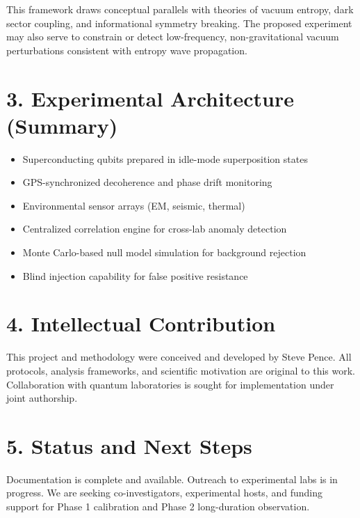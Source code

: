 \documentclass[12pt]{article}
\begin{document}
This framework draws conceptual parallels with theories of vacuum entropy, dark sector coupling, and informational symmetry breaking. The proposed experiment may also serve to constrain or detect low-frequency, non-gravitational vacuum perturbations consistent with entropy wave propagation.

\section*{3. Experimental Architecture (Summary)}
\begin{itemize}
  \item Superconducting qubits prepared in idle-mode superposition states
  \item GPS-synchronized decoherence and phase drift monitoring
  \item Environmental sensor arrays (EM, seismic, thermal)
  \item Centralized correlation engine for cross-lab anomaly detection
  \item Monte Carlo-based null model simulation for background rejection
  \item Blind injection capability for false positive resistance
\end{itemize}

\section*{4. Intellectual Contribution}
This project and methodology were conceived and developed by Steve Pence. All protocols, analysis frameworks, and scientific motivation are original to this work. Collaboration with quantum laboratories is sought for implementation under joint authorship.

\section*{5. Status and Next Steps}
Documentation is complete and available. Outreach to experimental labs is in progress. We are seeking co-investigators, experimental hosts, and funding support for Phase 1 calibration and Phase 2 long-duration observation.
\end{document}
